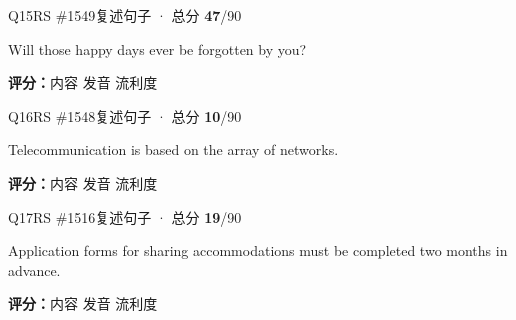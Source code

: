 \begin{qblock}{Q15\quad RS \#1549}{复述句子 · 总分 \textcolor{cAccent}{\bfseries 47}/90}
\begin{promptbox}
Will those happy days ever be forgotten by you?
\end{promptbox}
\asrlegend
\begin{asrbox}
        
\end{asrbox}
\smallskip
{\small\textbf{评分：}内容  \quad\textperiodcentered\quad 发音  \quad\textperiodcentered\quad 流利度 }
\end{qblock}

\begin{qblock}{Q16\quad RS \#1548}{复述句子 · 总分 \textcolor{cAccent}{\bfseries 10}/90}
\begin{promptbox}
Telecommunication is based on the array of networks.
\end{promptbox}
\asrlegend
\begin{asrbox}
       
\end{asrbox}
\smallskip
{\small\textbf{评分：}内容  \quad\textperiodcentered\quad 发音  \quad\textperiodcentered\quad 流利度 }
\end{qblock}

\begin{qblock}{Q17\quad RS \#1516}{复述句子 · 总分 \textcolor{cAccent}{\bfseries 19}/90}
\begin{promptbox}
Application forms for sharing accommodations must be completed two months in advance.
\end{promptbox}
\asrlegend
\begin{asrbox}
           
\end{asrbox}
\smallskip
{\small\textbf{评分：}内容  \quad\textperiodcentered\quad 发音  \quad\textperiodcentered\quad 流利度 }
\end{qblock}

